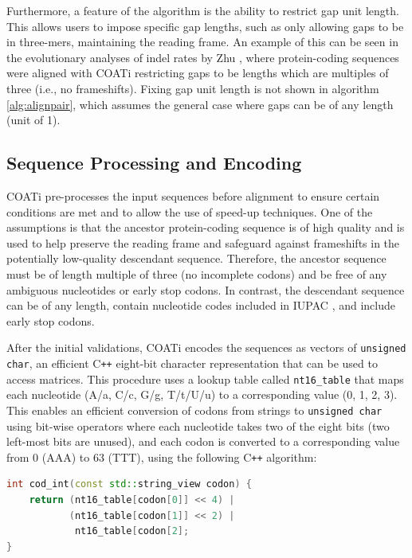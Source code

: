 Furthermore, a feature of the algorithm is the ability to restrict gap unit length. This allows users to impose specific gap lengths, such as only allowing gaps to be in three-mers, maintaining the reading frame. An example of this can be seen in the evolutionary analyses of indel rates by Zhu \citeyearpar{zhu2022profiling}, where protein-coding sequences were aligned with COATi restricting gaps to be lengths which are multiples of three (i.e., no frameshifts). Fixing gap unit length is not shown in algorithm \ref{alg:alignpair}, which assumes the general case where gaps can be of any length (unit of 1).



\subsection{Sequence Processing and Encoding} %

COATi pre-processes the input sequences before alignment to ensure certain conditions are met and to allow the use of speed-up techniques. One of the assumptions is that the ancestor protein-coding sequence is of high quality and is used to help preserve the reading frame and safeguard against frameshifts in the potentially low-quality descendant sequence. Therefore, the ancestor sequence must be of length multiple of three (no incomplete codons) and be free of any ambiguous nucleotides or early stop codons. In contrast, the descendant sequence can be of any length, contain nucleotide codes included in IUPAC \citep{cornish_1985_nomenclature}, and include early stop codons.

After the initial validations, COATi encodes the sequences as vectors of \verb|unsigned| \verb|char|, an efficient C\texttt{++} eight-bit character representation that can be used to access matrices. This procedure uses a lookup table called \verb|nt16_table| that maps each nucleotide (A/a, C/c, G/g, T/t/U/u) to a corresponding value (0, 1, 2, 3). This enables an efficient conversion of codons from strings to \verb|unsigned char| using bit-wise operators where each nucleotide takes two of the eight bits (two left-most bits are unused), and each codon is converted to a corresponding value from 0 (AAA) to 63 (TTT), using the following C\texttt{++} algorithm:

\begin{lstlisting}[language=C++]
int cod_int(const std::string_view codon) {
    return (nt16_table[codon[0]] << 4) |
           (nt16_table[codon[1]] << 2) |
            nt16_table[codon[2];
} 
\end{lstlisting}

